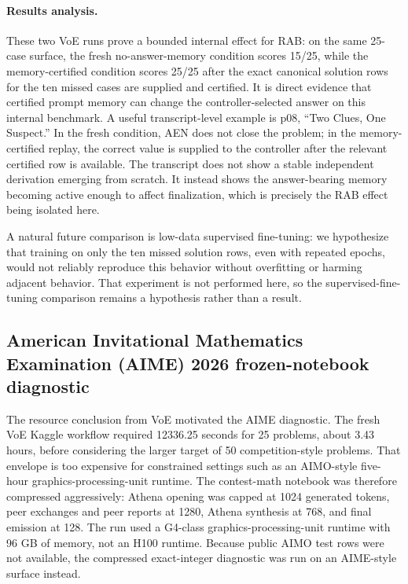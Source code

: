 \documentclass[11pt]{article}
\newcommand{\rab}{RAB}
\begin{document}
\paragraph{Results analysis.}
These two VoE runs prove a bounded internal effect for \rab{}: on the same 25-case surface, the fresh no-answer-memory condition scores 15/25, while the memory-certified condition scores 25/25 after the exact canonical solution rows for the ten missed cases are supplied and certified. It is direct evidence that certified prompt memory can change the controller-selected answer on this internal benchmark. A useful transcript-level example is p08, ``Two Clues, One Suspect.'' In the fresh condition, AEN does not close the problem; in the memory-certified replay, the correct value is supplied to the controller after the relevant certified row is available. The transcript does not show a stable independent derivation emerging from scratch. It instead shows the answer-bearing memory becoming active enough to affect finalization, which is precisely the \rab{} effect being isolated here.

A natural future comparison is low-data supervised fine-tuning: we hypothesize that training on only the ten missed solution rows, even with repeated epochs, would not reliably reproduce this behavior without overfitting or harming adjacent behavior. That experiment is not performed here, so the supervised-fine-tuning comparison remains a hypothesis rather than a result.

\subsection{American Invitational Mathematics Examination (AIME) 2026 frozen-notebook diagnostic}

The resource conclusion from VoE motivated the AIME diagnostic. The fresh VoE Kaggle workflow required 12336.25 seconds for 25 problems, about 3.43 hours, before considering the larger target of 50 competition-style problems. That envelope is too expensive for constrained settings such as an AIMO-style five-hour graphics-processing-unit runtime. The contest-math notebook was therefore compressed aggressively: Athena opening was capped at 1024 generated tokens, peer exchanges and peer reports at 1280, Athena synthesis at 768, and final emission at 128. The run used a G4-class graphics-processing-unit runtime with 96 GB of memory, not an H100 runtime. Because public AIMO test rows were not available, the compressed exact-integer diagnostic was run on an AIME-style surface instead.
\end{document}
